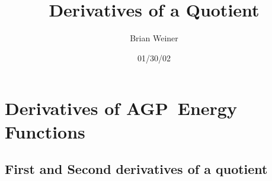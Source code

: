 \documentclass[aps,preprint]{revtex4}
\begin{document}
\preprint{}
\title[Quotient Derivatives]{Derivatives of a Quotient}
\author{Brian Weiner}
\author{}
\keywords{}
\date{01/30/02}
\endpage{}
\maketitle
\tableofcontents

\section{ Derivatives of AGP\ Energy Functions}

\subsection{First and Second derivatives of a quotient}
\end{document}
